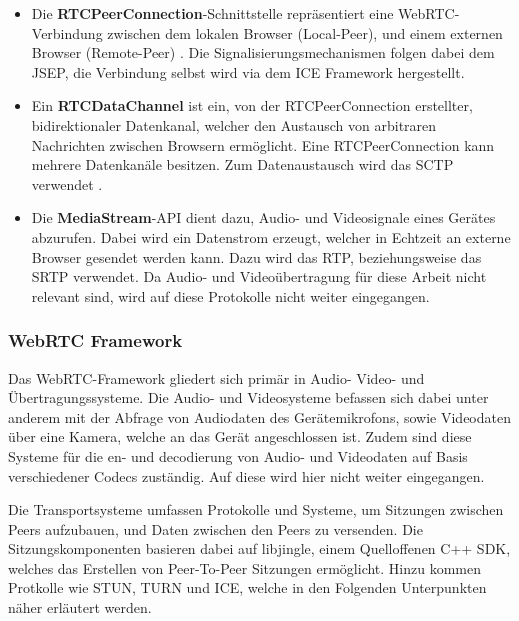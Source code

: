 \begin{itemize}
  \item Die \textbf{RTCPeerConnection}-Schnittstelle repräsentiert eine WebRTC-Verbindung zwischen dem lokalen Browser (Local-Peer), und einem externen Browser (Remote-Peer) \cite{rtcpeerconnection}. Die Signalisierungsmechanismen folgen dabei dem \ac{JSEP}, die Verbindung selbst wird via dem \ac{ICE} Framework hergestellt.
  
  \item Ein \textbf{RTCDataChannel} ist ein, von der RTCPeerConnection erstellter, bidirektionaler Datenkanal, welcher den Austausch von arbitraren Nachrichten zwischen Browsern ermöglicht. Eine RTCPeerConnection kann mehrere Datenkanäle besitzen. Zum Datenaustausch wird das \ac{SCTP} verwendet \cite{rtcpeerconnection}.
  
  \item Die \textbf{MediaStream}-\acs{API} dient dazu, Audio- und Videosignale eines Gerätes abzurufen. Dabei wird ein Datenstrom erzeugt, welcher in Echtzeit an externe Browser gesendet werden kann. Dazu wird das \ac{RTP}, beziehungsweise das \ac{SRTP} verwendet. Da Audio- und Videoübertragung für diese Arbeit nicht relevant sind, wird auf diese Protokolle nicht weiter eingegangen.
\end{itemize}

\subsubsection*{WebRTC Framework}
Das \acs{WebRTC}-Framework gliedert sich primär in Audio- Video- und Übertragungssysteme. Die Audio- und Videosysteme befassen sich dabei unter anderem mit der Abfrage von Audiodaten des Gerätemikrofons, sowie Videodaten über eine Kamera, welche an das Gerät angeschlossen ist. Zudem sind diese Systeme für die en- und decodierung von Audio- und Videodaten auf Basis verschiedener \glqq{}Codecs\grqq{} zuständig. Auf diese wird hier nicht weiter eingegangen.\par

Die Transportsysteme umfassen Protokolle und Systeme, um Sitzungen zwischen Peers aufzubauen, und Daten zwischen den Peers zu versenden. Die Sitzungskomponenten basieren dabei auf \glqq{}libjingle\grqq{}, einem Quelloffenen C++ \ac{SDK}, welches das Erstellen von Peer-To-Peer Sitzungen ermöglicht. Hinzu kommen Protkolle wie \acs{STUN}, \acs{TURN} und \acs{ICE}, welche in den Folgenden Unterpunkten näher erläutert werden.


